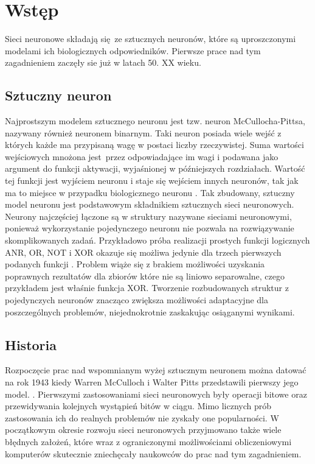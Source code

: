 
\chapter{Wstęp}

Sieci neuronowe składają się ze sztucznych neuronów, które są uproszczonymi modelami ich
biologicznych odpowiedników. Pierwsze prace nad tym zagadnieniem zaczęły sie już w latach 50.
XX wieku.

\section{Sztuczny neuron}

Najprostszym modelem sztucznego neuronu jest tzw. neuron McCullocha-Pittsa, nazywany
również neuronem binarnym. Taki neuron posiada wiele wejść z których każde ma przypisaną
wagę w postaci liczby rzeczywistej. Suma wartości wejściowych mnożona jest przez odpowiadające
im wagi i podawana jako argument do funkcji aktywacji, wyjaśnionej w późniejszych rozdziałach.
Wartość tej funkcji jest wyjściem neuronu i staje się wejściem innych neuronów,
tak jak ma to miejsce w przypadku biologicznego neuronu \cite{CS231n}.
Tak zbudowany, sztuczny model neuronu jest podstawowym składnikiem sztucznych sieci
neuronowych.\\
Neurony najczęściej łączone są w struktury nazywane sieciami neuronowymi, ponieważ wykorzystanie
pojedynczego neuronu nie pozwala na rozwiązywanie skomplikowanych zadań.
Przykładowo próba realizacji prostych funkcji logicznych ANR, OR, NOT i XOR okazuje
się możliwa jedynie dla trzech pierwszych podanych funkcji \cite{XORproblem}.
Problem wiąże się z brakiem możliwości uzyskania poprawnych rezultatów dla zbiorów które
nie są liniowo separowalne, czego przykładem jest właśnie funkcja XOR. Tworzenie rozbudowanych
struktur z pojedynczych neuronów znacząco zwiększa możliwości adaptacyjne
dla poszczególnych problemów, niejednokrotnie zaskakując osiąganymi wynikami.

\section{Historia}

Rozpoczęcie prac nad wspomnianym wyżej sztucznym neuronem można datować na rok 1943 kiedy
Warren McCulloch i Walter Pitts przedstawili pierwszy jego model. \cite{NNbiology}.
Pierwszymi zastosowaniami sieci neuronowych były operacji bitowe oraz przewidywania kolejnych
wystąpień bitów w ciągu. Mimo licznych prób zastosowania ich do realnych problemów
nie zyskały one popularności. W początkowym okresie rozwoju sieci neuronowych
przyjmowano także wiele błędnych założeń, które wraz z ograniczonymi możliwościami
obliczeniowymi komputerów skutecznie zniechęcały naukowców do prac nad tym zagadnieniem.\\
